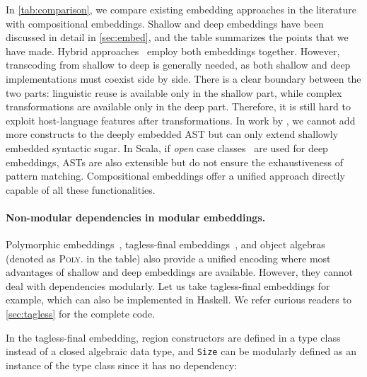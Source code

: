 \noindent
In \autoref{tab:comparison}, we compare existing embedding approaches in the
literature with compositional embeddings. Shallow and deep embeddings have been
discussed in detail in \autoref{sec:embed}, and the table summarizes the points
that we have made. Hybrid
approaches~\citep{rompf2012scala,svenningsson2015combining,jovanovic2014yinyang}
employ both embeddings together. However, transcoding from shallow to deep is
generally needed, as both shallow and deep implementations must coexist side by
side. There is a clear boundary between the two parts: linguistic reuse is
available only in the shallow part, while complex transformations are available
only in the deep part. Therefore, it is still hard to exploit host-language
features after transformations. In work by
\citeauthor{svenningsson2015combining}, we cannot add more constructs to the
deeply embedded AST but can only extend shallowly embedded syntactic sugar. In
Scala, if \emph{open} case classes~\citep{emir2007matching} are used for deep
embeddings, ASTs are also extensible but do not ensure the exhaustiveness of
pattern matching. Compositional embeddings offer a unified approach directly
capable of all these functionalities.

\paragraph{Non-modular dependencies in modular embeddings.}
Polymorphic embeddings~\citep{hofer2008polymorphic}, tagless-final
embeddings~\citep{carette2009finally,kiselyov2010typed}, and object
algebras~\citep{oliveira2012extensibility} (denoted as \textsc{Poly.} in the
table) also provide a unified encoding where most advantages of shallow and deep
embeddings are available. However, they cannot deal with dependencies modularly.
Let us take tagless-final embeddings for example, which can also be implemented
in Haskell. We refer curious readers to \autoref{sec:tagless} for the complete
code.

In the tagless-final embedding, region constructors are defined in a type class
instead of a closed algebraic data type, and \lstinline{Size} can be modularly
defined as an instance of the type class since it has no dependency:

